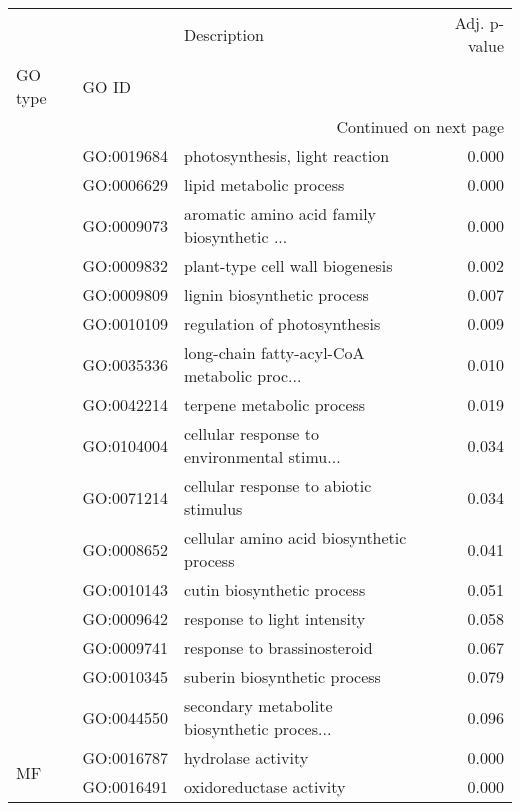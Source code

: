 \begin{longtable}{lllr}
\toprule
   &            &                                  Description &  Adj. p-value \\
GO type & GO ID &                                              &               \\
\midrule
\endhead
\midrule
\multicolumn{4}{r}{{Continued on next page}} \\
\midrule
\endfoot

\bottomrule
\endlastfoot
\multirow{16}{*}{BP} & GO:0019684 &               photosynthesis, light reaction &         0.000 \\
   & GO:0006629 &                      lipid metabolic process &         0.000 \\
   & GO:0009073 &  aromatic amino acid family biosynthetic ... &         0.000 \\
   & GO:0009832 &              plant-type cell wall biogenesis &         0.002 \\
   & GO:0009809 &                  lignin biosynthetic process &         0.007 \\
   & GO:0010109 &                 regulation of photosynthesis &         0.009 \\
   & GO:0035336 &  long-chain fatty-acyl-CoA metabolic proc... &         0.010 \\
   & GO:0042214 &                    terpene metabolic process &         0.019 \\
   & GO:0104004 &  cellular response to environmental stimu... &         0.034 \\
   & GO:0071214 &        cellular response to abiotic stimulus &         0.034 \\
   & GO:0008652 &     cellular amino acid biosynthetic process &         0.041 \\
   & GO:0010143 &                   cutin biosynthetic process &         0.051 \\
   & GO:0009642 &                  response to light intensity &         0.058 \\
   & GO:0009741 &                  response to brassinosteroid &         0.067 \\
   & GO:0010345 &                 suberin biosynthetic process &         0.079 \\
   & GO:0044550 &  secondary metabolite biosynthetic proces... &         0.096 \\
\cline{1-4}
\multirow{2}{*}{MF} & GO:0016787 &                           hydrolase activity &         0.000 \\
   & GO:0016491 &                      oxidoreductase activity &         0.000 \\
\end{longtable}
